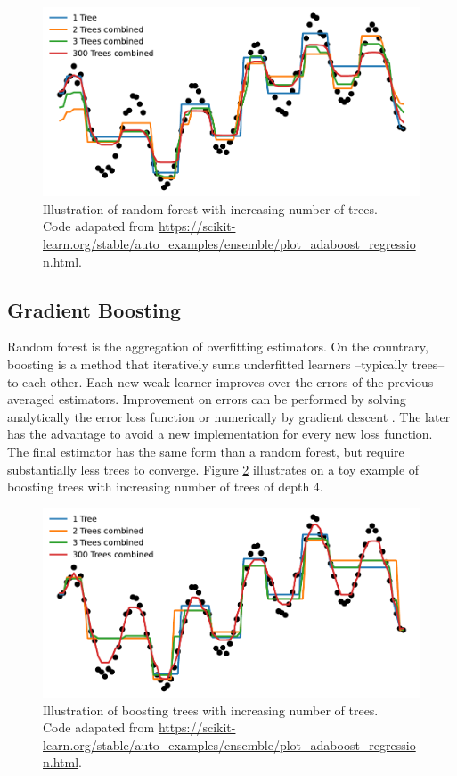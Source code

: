 \documentclass[french,12pt,twoside,a4paper]{book}
\begin{document}
\begin{appendices}
  \begin{figure}[!t]
    \centering
    \includegraphics[width=0.8\linewidth]{img/chapter_1/forest_4.pdf}
    \caption{Illustration of random forest with increasing number of
      trees.\\Code adapated from
      \url{https://scikit-learn.org/stable/auto_examples/ensemble/plot_adaboost_regression.html}.}%
    \label{fig:forest_regression}
  \end{figure}


  \subsection{Gradient Boosting}\label{apd:intro:boosting}

  Random forest is the aggregation of overfitting estimators. On the countrary,
  boosting \citep{freund1995desicion} is a method that iteratively sums
  underfitted learners --typically trees-- to each other. Each new weak learner
  improves over the errors of the previous averaged estimators. Improvement on
  errors can be performed by solving analytically the error loss function or
  numerically by gradient descent \citep{friedman2001greedy}. The later has the
  advantage to avoid a new implementation for every new loss function. The final
  estimator has the same form than a random forest, but require substantially
  less trees to converge. Figure \ref{fig:boosting_regression} illustrates on a
  toy example of boosting trees with increasing number of trees of depth 4.

  \begin{figure}[!b]
    \centering
    \includegraphics[width=0.8\linewidth]{img/chapter_1/boosting_4.pdf}
    \caption{Illustration of boosting trees with increasing number of
      trees.\\Code adapated from
      \url{https://scikit-learn.org/stable/auto_examples/ensemble/plot_adaboost_regression.html}.}%
    \label{fig:boosting_regression}
  \end{figure}


\end{appendices}
\end{document}
